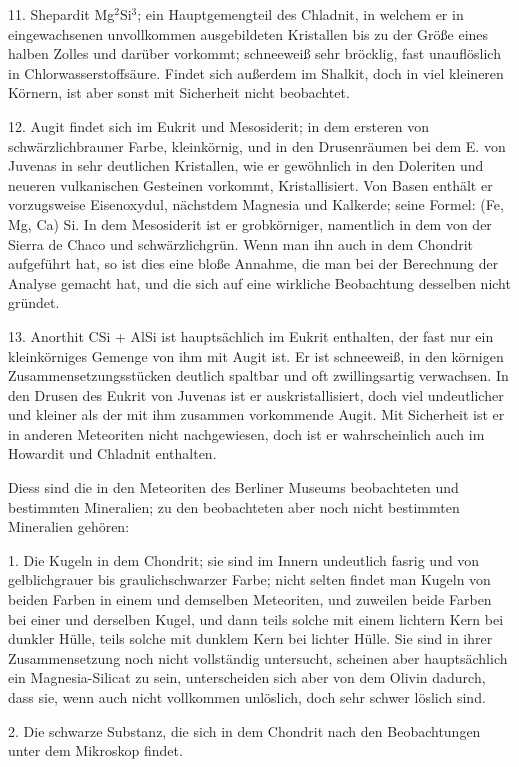 \documentclass[a4paper, 11pt, oneside]{article}
\begin{document}
11. Shepardit Mg$^{2}$Si$^{3}$; ein Hauptgemengteil des Chladnit, in welchem er in eingewachsenen unvollkommen ausgebildeten Kristallen bis zu der Größe eines halben Zolles und darüber vorkommt; schneeweiß sehr bröcklig, fast unauflöslich in Chlorwasserstoffsäure. Findet sich außerdem im Shalkit, doch in viel kleineren Körnern, ist aber sonst mit Sicherheit nicht beobachtet.

12. Augit findet sich im Eukrit und Mesosiderit; in dem ersteren von schwärzlichbrauner Farbe, kleinkörnig, und in den Drusenräumen bei dem E. von Juvenas in sehr deutlichen Kristallen, wie er gewöhnlich in den Doleriten und neueren vulkanischen Gesteinen vorkommt, Kristallisiert. Von Basen enthält er vorzugsweise Eisenoxydul, nächstdem Magnesia und Kalkerde; seine Formel: (Fe, Mg, Ca) Si. In dem Mesosiderit ist er grobkörniger, namentlich in dem von der Sierra de Chaco und schwärzlichgrün. Wenn man ihn auch in dem Chondrit aufgeführt hat, so ist dies eine bloße Annahme, die man bei der Berechnung der Analyse gemacht hat, und die sich auf eine wirkliche Beobachtung desselben nicht gründet.

13. Anorthit CSi + AlSi ist hauptsächlich im Eukrit enthalten, der fast nur ein kleinkörniges Gemenge von ihm mit Augit ist. Er ist schneeweiß, in den körnigen Zusammensetzungsstücken deutlich spaltbar und oft zwillingsartig verwachsen. In den Drusen des Eukrit von Juvenas ist er auskristallisiert, doch viel undeutlicher und kleiner als der mit ihm zusammen vorkommende Augit. Mit Sicherheit ist er in anderen Meteoriten nicht nachgewiesen, doch ist er wahrscheinlich auch im Howardit und Chladnit enthalten.

Diess sind die in den Meteoriten des Berliner Museums beobachteten und bestimmten Mineralien; zu den beobachteten aber noch nicht bestimmten Mineralien gehören:

1. Die Kugeln in dem Chondrit; sie sind im Innern undeutlich fasrig und von gelblichgrauer bis graulichschwarzer Farbe; nicht selten findet man Kugeln von beiden Farben in einem und demselben Meteoriten, und zuweilen beide Farben bei einer und derselben Kugel, und dann teils solche mit einem lichtern Kern bei dunkler Hülle, teils solche mit dunklem Kern bei lichter Hülle. Sie sind in ihrer Zusammensetzung noch nicht vollständig untersucht, scheinen aber hauptsächlich ein Magnesia-Silicat zu sein, unterscheiden sich aber von dem Olivin dadurch, dass sie, wenn auch nicht vollkommen unlöslich, doch sehr schwer löslich sind.

2. Die schwarze Substanz, die sich in dem Chondrit nach den Beobachtungen unter dem Mikroskop findet.
\end{document}
